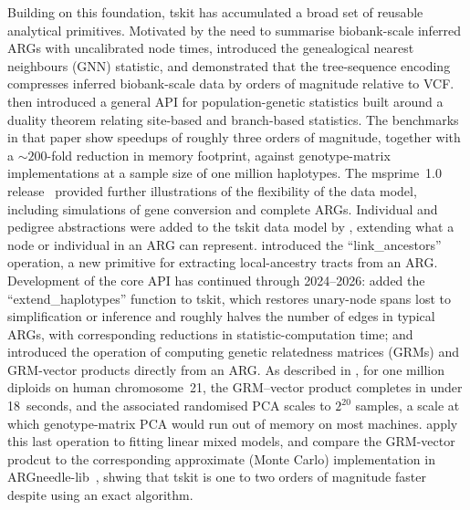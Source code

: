 \documentclass{article}
\begin{document}
Building on this foundation, tskit has accumulated a broad set of
reusable analytical primitives.
Motivated by the need to summarise biobank-scale inferred ARGs with
uncalibrated node times, \citet{kelleher2019inferring} introduced the
genealogical nearest neighbours (GNN) statistic, and demonstrated that
the tree-sequence encoding compresses inferred biobank-scale data by
orders of magnitude relative to VCF.
\citet{ralph2020efficiently} then introduced a general API for
population-genetic statistics built around a duality theorem relating
site-based and branch-based statistics. The benchmarks in that paper
show speedups of roughly three orders of magnitude, together with a
$\sim 200$-fold reduction in memory footprint, against genotype-matrix
implementations at a sample size of one million haplotypes.
The msprime~1.0 release~\citep{baumdicker2022efficient} provided
further illustrations of the flexibility of the data model, including
simulations of gene conversion and complete ARGs.
Individual and pedigree abstractions were added to the tskit data
model by \citet{andersontrocme2023genes}, extending what a node or
individual in an ARG can represent.
\citet{tsambos2023link} introduced the ``link\_ancestors'' operation,
a new primitive for extracting local-ancestry tracts from an ARG.
Development of the core API has continued through 2024--2026:
\citet{fritze2026forest} added the ``extend\_haplotypes'' function to
tskit, which restores unary-node spans lost to simplification or
inference and roughly halves the number of edges in typical ARGs, with
corresponding reductions in statistic-computation time; and
\citet{lehmann2026on} introduced the operation of computing genetic
relatedness matrices (GRMs) and GRM-vector products directly from an ARG.
As described in \citet{lehmann2026on},
for one million diploids on human chromosome~21, the 
GRM--vector product completes in under 18~seconds, and the associated
randomised PCA scales to $2^{20}$ samples, a scale at which genotype-matrix PCA
would run out of memory on most machines.
\citet{lee2026genetic} apply this last operation to fitting linear mixed models,
and compare the GRM-vector prodcut to the corresponding approximate (Monte Carlo)
implementation in ARGneedle-lib~\citep{zhang2023biobank}, shwing that tskit is
one to two orders of magnitude faster despite using an exact algorithm.
\end{document}
